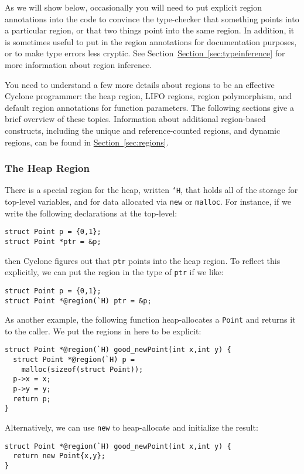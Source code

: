 As we will show below, occasionally you will need to put explicit
region annotations into the code to convince the type-checker that
something points into a particular region, or that two things point
into the same region.  In addition, it is sometimes useful to put in
the region annotations for documentation purposes, or to make type
errors less cryptic.  See
Section~\hyperref[{sec:typeinference}]{Section~\ref{sec:typeinference}}
for more information about region inference.


You need to understand a few more details about regions to
be an effective Cyclone programmer:  the heap region, LIFO
regions, region polymorphism, and default region 
annotations for
function parameters.  The following sections give a brief overview
of these topics.  Information about additional region-based
constructs, including the unique and reference-counted regions, and
dynamic regions, can be found in
\hyperref[{sec:regions}]{Section~\ref{sec:regions}}.

\subsubsection*{The Heap Region}

There is a special region for the heap, written \texttt{`H}, that
holds all of the storage for top-level variables, and for data
allocated via \texttt{new} or \texttt{malloc}.  For instance, if we
write the following declarations at the top-level:
\begin{verbatim}
struct Point p = {0,1};
struct Point *ptr = &p;
\end{verbatim}
then Cyclone figures out that \texttt{ptr} points into the heap
region.  To reflect this explicitly, we can put the region in
the type of \texttt{ptr} if we like:
\begin{verbatim}
struct Point p = {0,1};
struct Point *@region(`H) ptr = &p;
\end{verbatim}

As another example, the following function heap-allocates a \texttt{Point} and
returns it to the caller.  We put the regions in here to be explicit:
\begin{verbatim}
struct Point *@region(`H) good_newPoint(int x,int y) {
  struct Point *@region(`H) p = 
    malloc(sizeof(struct Point));
  p->x = x;
  p->y = y;
  return p;
}
\end{verbatim}
Alternatively, we can use \texttt{new} to heap-allocate and 
initialize the result:
\begin{verbatim}
struct Point *@region(`H) good_newPoint(int x,int y) {
  return new Point{x,y};
}
\end{verbatim}

